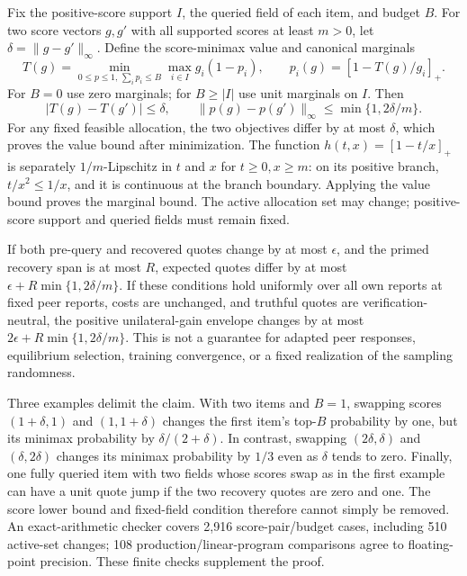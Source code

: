 \documentclass[11pt]{article}
\begin{document}
Fix the positive-score support $I$, the queried field of each item, and budget
$B$. For two score vectors $g,g'$ with all supported scores at least $m>0$, let
$\delta=\|g-g'\|_\infty$. Define the score-minimax value and canonical marginals
\[
 T(g)=\min_{0\leq p\leq1,\,\sum_i p_i\leq B}\max_{i\in I}g_i(1-p_i),
 \qquad p_i(g)=[1-T(g)/g_i]_+.
\]
For $B=0$ use zero marginals; for $B\geq |I|$ use unit marginals on $I$.
Then
\[
 |T(g)-T(g')|\leq\delta,\qquad
 \|p(g)-p(g')\|_\infty\leq\min\{1,2\delta/m\}.
\]
For any fixed feasible allocation, the two objectives differ by at most
$\delta$, which proves the value bound after minimization. The function
$h(t,x)=[1-t/x]_+$ is separately $1/m$-Lipschitz in $t$ and $x$ for
$t\geq0,x\geq m$: on its positive branch, $t/x^2\leq1/x$, and it is
continuous at the branch boundary. Applying the value bound proves the
marginal bound. The active allocation set may change; positive-score support
and queried fields must remain fixed.

If both pre-query and recovered quotes change by at most $\epsilon$, and the
primed recovery span is at most $R$, expected quotes differ by at most
$\epsilon+R\min\{1,2\delta/m\}$. If these conditions hold uniformly over
all own reports at fixed peer reports, costs are unchanged, and truthful
quotes are verification-neutral, the positive unilateral-gain envelope changes
by at most $2\epsilon+R\min\{1,2\delta/m\}$. This is not a guarantee for
adapted peer responses, equilibrium selection, training convergence, or a
fixed realization of the sampling randomness.

Three examples delimit the claim. With two items and $B=1$, swapping scores
$(1+\delta,1)$ and $(1,1+\delta)$ changes the first item's top-$B$ probability
by one, but its minimax probability by $\delta/(2+\delta)$. In contrast,
swapping $(2\delta,\delta)$ and $(\delta,2\delta)$ changes its minimax
probability by $1/3$ even as $\delta$ tends to zero. Finally, one fully queried
item with two fields whose scores swap as in the first example can have a
unit quote jump if the two recovery quotes are zero and one. The score lower
bound and fixed-field condition therefore cannot simply be removed.
An exact-arithmetic checker covers 2,916 score-pair/budget cases, including
510 active-set changes; 108 production/linear-program comparisons agree to
floating-point precision. These finite checks supplement the proof.
\end{document}
